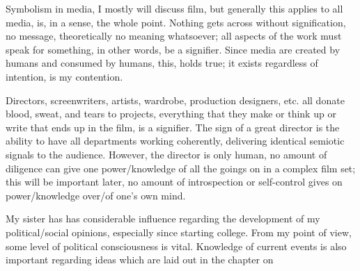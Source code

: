 \documentclass[../butidigress.tex]{subfiles}
\begin{document}
Symbolism in media, I mostly will discuss film, but generally this applies to all media, is, in a sense, the whole point.
Nothing gets across without signification, no message, theoretically no meaning whatsoever; all aspects of the work must speak for something, in other words, be a signifier.
Since media are created by humans and consumed by humans, this,  holds true; it exists regardless of intention, is my contention.

Directors, screenwriters, artists, wardrobe, production designers, etc. all donate blood, sweat, and tears to projects, everything that they make or think up or write that ends up in the film, is a signifier.
The sign of a great director is the ability to have all departments working coherently, delivering identical semiotic signals to the audience.
However, the director is only human, no amount of diligence can give one power/knowledge of all the goings on in a complex film set; this will be important later, no amount of introspection or self-control gives on power/knowledge over/of one's own mind.

My sister has has considerable influence regarding the development of my political/social opinions, especially since starting college.
From my point of view, some level of political consciousness is vital.
Knowledge of current events is also important regarding ideas which are laid out in the chapter on 
\end{document}
